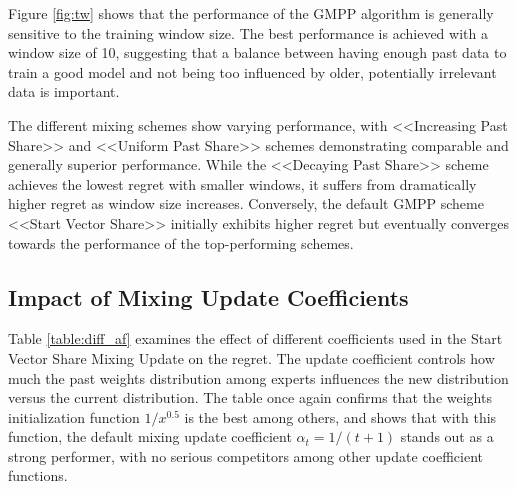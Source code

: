 \documentclass[12pt, twoside]{article}
\begin{document}
Figure \ref{fig:tw}  shows that the performance of the GMPP algorithm is generally sensitive to the training window size.
The best performance is achieved with a window size of 10, suggesting that a balance between having enough past data to train a good model and not being too influenced by older, potentially irrelevant data is important.

The different mixing schemes show varying performance, with <<Increasing Past Share>> and <<Uniform Past Share>> schemes demonstrating comparable and generally superior performance. While the <<Decaying Past Share>> scheme achieves the lowest regret with smaller windows, it suffers from dramatically higher regret as window size increases. Conversely, the default GMPP scheme <<Start Vector Share>> initially exhibits higher regret but eventually converges towards the performance of the top-performing schemes.


\subsection{Impact of Mixing Update Coefficients}

Table \ref{table:diff_af} examines the effect of different coefficients used in the Start Vector Share Mixing Update on the regret. 
The update coefficient controls how much the past weights distribution among experts influences the new distribution versus the current distribution. The table once again confirms that the weights initialization function $1/x^{0.5}$ is the best among others, and shows that with this function, 
the default mixing update coefficient $\alpha_t = 1 / (t + 1)$ stands out as a strong performer, with no serious competitors among other update coefficient functions. 
\end{document}
